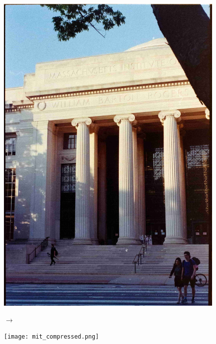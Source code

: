 \documentclass{beamer}
\theoremstyle{definition}
\begin{document}
\begin{frame}
\begin{figure}[!htb]
	\centering
	\begin{minipage}{0.45\textwidth}
		\centering
		\includegraphics[scale=0.03]{mit.jpg}
	\end{minipage}
	$\to$
	\begin{minipage}{0.45\textwidth}
		\centering
		\texttt{[image: mit\_compressed.png]}
	\end{minipage}
\end{figure}
\end{frame}
\end{document}
